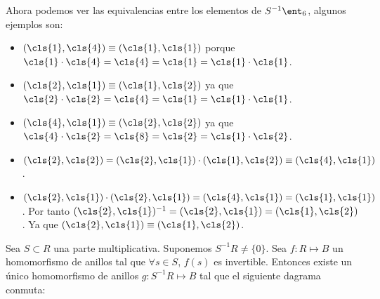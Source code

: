 \begin{example}
	Ahora podemos ver las equivalencias entre los elementos de $S^{-1}\ent_6$, algunos ejemplos son:
	\begin{itemize}
		\item $(\cls{1},\cls{4})\equiv (\cls{1},\cls{1})$ porque $\cls{1}\cdot \cls{4} = \cls{4} = \cls{1} =\cls{1}\cdot \cls{1}$.
		\item $(\cls{2},\cls{1}) \equiv (\cls{1},\cls{2})$ ya que $\cls{2}\cdot \cls{2} = \cls{4} = \cls{1} =\cls{1}\cdot \cls{1}$.
		\item $(\cls{4},\cls{1}) \equiv (\cls{2},\cls{2})$ ya que $\cls{4}\cdot \cls{2} = \cls{8} = \cls{2} =\cls{1}\cdot \cls{2}$. 
		\item $(\cls{2}, \cls{2}) = (\cls{2},\cls{1}) \cdot (\cls{1},\cls{2}) \equiv (\cls{4},\cls{1}) $.
		\item $(\cls{2},\cls{1}) \cdot (\cls{2},\cls{1}) = (\cls{4},\cls{1}) = (\cls{1},\cls{1})$. Por tanto $(\cls{2},\cls{1})^{-1}=(\cls{2},\cls{1}) = (\cls{1},\cls{2})$. Ya que $(\cls{2},\cls{1}) \equiv (\cls{1},\cls{2})$.
	\end{itemize}
	\end{example}
	
	\begin{theorem}
		Sea $S\subset R$ una parte multiplicativa. Suponemos $S^{-1}R \neq \{0\}$. Sea $f:R \longmapsto B$ un homomorfismo de anillos tal que $\forall s \in S$, $f(s)$ es invertible. Entonces existe un único homomorfismo de anillos $g: S^{-1}R \longmapsto B$ tal que el siguiente dagrama conmuta:
		
	\end{theorem}
	
